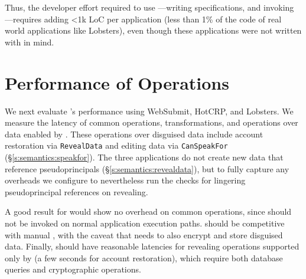 Thus, the developer effort required to use \sys---writing \sys specifications,
and invoking \sys---requires adding <1k LoC per application (less than 1\% of
the code of real world applications like Lobsters), even though these
applications were not written with \sys in mind.

\section{Performance of \sys Operations}
\label{s:eval-ops}

%
We next evaluate \sys's performance using WebSubmit,
HotCRP, and Lobsters.
%
%
We measure the latency of common operations, \xxing transformations, and
operations over \xxed data enabled by \sys. These operations over disguised data
include account restoration via
\texttt{RevealData} and editing
\xxed data via \texttt{CanSpeakFor} (\S\ref{s:semantics:speakfor}).
%
The three applications do not create new data that reference pseudoprincipals
(\S\ref{s:semantics:revealdata}), but to fully capture any overheads we
configure \sys to nevertheless run the checks for lingering pseudoprincipal
references on revealing.
%

%
A good result for \sys would show no overhead on common operations, since \sys
should not be invoked on normal application execution paths.
%
\sys should be competitive with manual \xxing, with the caveat that \sys needs
to also encrypt and store disguised data.
%
Finally, \sys should have reasonable latencies for revealing operations
supported only by \sys (\eg a few seconds for account restoration), which
require both database queries and cryptographic operations. 
%

